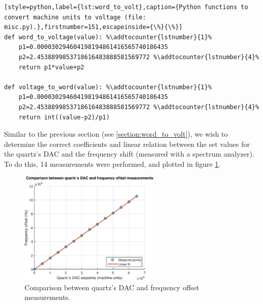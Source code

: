\documentclass[a4paper,12pt]{article}
\newcounter{subsubsubsection}[subsubsection]
\begin{document}
\begin{lstlisting}[style=python,label={lst:word_to_volt},caption={Python functions to convert machine units to voltage (file: misc.py).},firstnumber=151,escapeinside={\%}{\%}]
def word_to_voltage(value): %\addtocounter{lstnumber}{1}%
    p1=0.000030294604198194861416565740186435
    p2=2.4538899853718616483888581569772 %\addtocounter{lstnumber}{4}%
    return p1*value+p2

def voltage_to_word(value): %\addtocounter{lstnumber}{1}%
    p1=0.000030294604198194861416565740186435
    p2=2.4538899853718616483888581569772 %\addtocounter{lstnumber}{4}%
    return int((value-p2)/p1)
\end{lstlisting}

Similar to the previous section (see \ref{section:word_to_volt}), we wish to determine the correct coefficients and linear relation between the set values for the quartz's DAC and the frequency shift (measured with a spectrum analyzer). To do this, 14 measurements were performed, and plotted in figure \ref{fig:word_to_freq}.

\begin{figure}[!h]
    \centering
    \includegraphics[width=0.6\textwidth]{Images/word_to_frequency.eps}
    \captionsetup{justification=centering}
    \caption{Comparison between quartz's DAC and frequency offset measurements.} 
    \label{fig:word_to_freq}
\end{figure}
\end{document}
